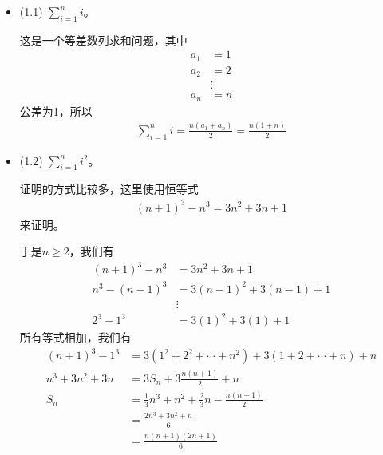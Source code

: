 \documentclass{article}
\begin{document}
\begin{itemize}
      \item (1.1) $\sum\limits_{i = 1}^n i$。

            这是一个等差数列求和问题，其中
            \begin{align*}
                  a_1 & = 1    \\
                  a_2 & = 2    \\
                      & \vdots \\
                  a_n & = n
            \end{align*}
            公差为1，所以
            \begin{align*}
                  \sum\limits_{i = 1}^n i = \frac{n(a_1 + a_n)}{2} = \frac{n(1 + n)}{2}
            \end{align*}

      \item (1.2) $\sum\limits_{i = 1}^n i^2$。

            证明的方式比较多，这里使用恒等式
            \begin{align*}
                  (n + 1)^3 - n^3 = 3n^2 + 3n + 1
            \end{align*}
            来证明。

            于是$n \geq 2$，我们有
            \begin{align*}
                  (n + 1)^3 - n^3 & = 3n^2 + 3n + 1           \\
                  n^3 - (n - 1)^3 & = 3(n-1)^2 + 3(n - 1) + 1 \\
                                  & \vdots                    \\
                  2^3 - 1^3       & = 3(1)^2 + 3(1) + 1
            \end{align*}
            所有等式相加，我们有
            \begin{align*}
                  (n + 1)^3 - 1^3 & = 3(1^2 + 2^2 + \cdots + n^2) + 3(1 + 2 + \cdots + n) + n  \\
                  n^3 + 3n^2 + 3n & = 3S_n + 3 \frac{n(n + 1)}{2} + n                          \\
                  S_n             & = \frac{1}{3}n^3 + n^2 + \frac{2}{3}n - \frac{n(n + 1)}{2} \\
                                  & = \frac{2n^3 + 3n^2 + n}{6}                                \\
                                  & = \frac{n(n + 1)(2n + 1)}{6}
            \end{align*}


\end{itemize}
\end{document}
